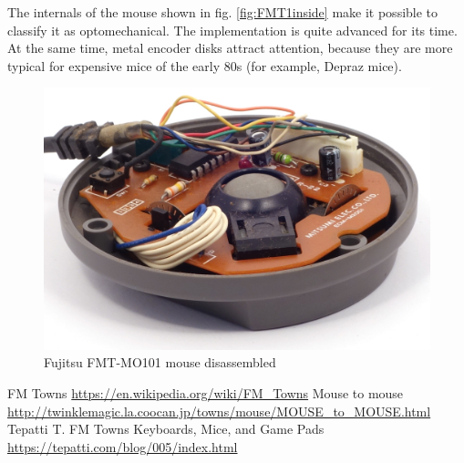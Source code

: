 \documentclass[11pt, a4paper]{article}
\begin{document}
The internals of the mouse shown in fig. \ref{fig:FMT1inside} make it possible to classify it as optomechanical. The implementation is quite advanced for its time. At the same time, metal encoder disks attract attention, because they are more typical for expensive mice of the early 80s (for example, Depraz mice).

\begin{figure}[h]
    \centering
    \includegraphics[scale=0.8]{1989_fujitsu_fmt_mo101_mouse/inside_30.jpg}
    \caption{Fujitsu FMT-MO101 mouse disassembled}
    \label{fig:FMT1Inside}
\end{figure}


\begin{thebibliography}{9}
     FM Towns \url{https://en.wikipedia.org/wiki/FM_Towns}
     Mouse to mouse \url{http://twinklemagic.la.coocan.jp/towns/mouse/MOUSE_to_MOUSE.html} 
     Tepatti T. FM Towns Keyboards, Mice, and Game Pads \url{https://tepatti.com/blog/005/index.html}
\end{thebibliography}
\end{document}
